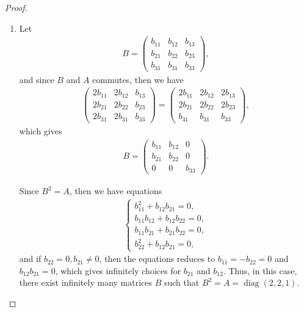 \documentclass[11pt]{article}
\theoremstyle{definition}
\numberwithin{equation}{subsection}
\begin{document}
\begin{proof}
\begin{enumerate}[label=(\alph*)]
    \item Let 
    \begin{align*}
        B = \begin{pmatrix}
            b_{11} & b_{12} & b_{13} \\
            b_{21} & b_{22} & b_{23} \\
            b_{31} & b_{31} & b_{33}
        \end{pmatrix},
    \end{align*}
    and since $B$ and $A$ commutes, then we have 
    \begin{align*}
        \begin{pmatrix}
            2b_{11} & 2b_{12} & b_{13} \\
            2b_{21} & 2b_{22} & b_{23} \\
            2b_{31} & 2b_{31} & b_{33}
        \end{pmatrix} = \begin{pmatrix}
            2b_{11} & 2b_{12} & 2b_{13} \\
            2b_{21} & 2b_{22} & 2b_{23} \\
            b_{31} & b_{31} & b_{33}
        \end{pmatrix},
    \end{align*}
    which gives 
    \begin{align*}
        B = \begin{pmatrix}
            b_{11} & b_{12} & 0 \\
            b_{21} & b_{22} & 0 \\
            0 & 0 & b_{33}
        \end{pmatrix}.
    \end{align*}
    
    Since $B^2 = A$, then we have equations
    \begin{align*}
        \begin{cases}
            b_{11}^2 + b_{12}b_{21} = 0, \\
            b_{11} b_{12} + b_{12} b_{22} = 0, \\
            b_{11} b_{21} + b_{21} b_{22} = 0, \\
            b_{22}^2 + b_{12}b_{21} = 0,
        \end{cases}
    \end{align*}
    and if $b_{22} = 0, b_{21} \neq 0$, then the equations reduces to $b_{11} = - b_{22} = 0$ and $b_{12}b_{21} = 0$, which gives infinitely choices for $b_{21}$ and $b_{12}$. Thus, in this case, there exist infinitely many matrices $B$ such that $B^2 = A = \operatorname{diag}(2, 2, 1)$.
\end{enumerate}
\end{proof}
\end{document}
